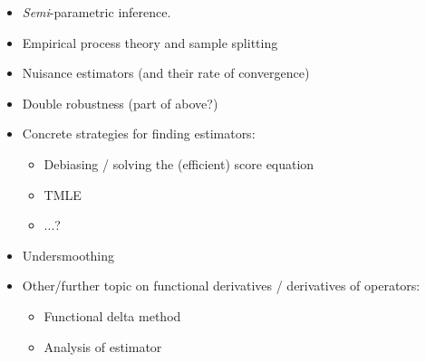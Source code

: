 \documentclass[a4,danish]{article}
\begin{document}
\begin{itemize}
\item \textit{Semi}-parametric inference.
\item Empirical process theory and sample splitting
\item Nuisance estimators (and their rate of convergence)
\item Double robustness (part of above?)
\item Concrete strategies for finding estimators:
  \begin{itemize}
  \item Debiasing / solving the (efficient) score equation
  \item TMLE
  \item ...?
  \end{itemize}
\item Undersmoothing
\item Other/further topic on functional derivatives / derivatives of operators:
  \begin{itemize}
  \item Functional delta method 
  \item Analysis of estimator
  \end{itemize}
\end{itemize}


\end{document}

